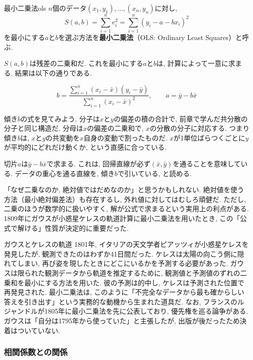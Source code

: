\begin{defi}{最小二乗法}{ols}
$n$個のデータ$(x_1, y_1), \ldots, (x_n, y_n)$に対し,
\[
  S(a, b) = \sum_{i=1}^{n} e_i^2 = \sum_{i=1}^{n} (y_i - a - bx_i)^2
\]
を最小にする$a$と$b$を選ぶ方法を\textbf{最小二乗法}（OLS: Ordinary Least Squares）と呼ぶ.
\end{defi}

$S(a, b)$は残差の二乗和だ.
これを最小にする$a$と$b$は, 計算によって一意に求まる.
結果は以下の通りである.

\[
  b = \frac{\displaystyle\sum_{i=1}^{n}(x_i - \bar{x})(y_i - \bar{y})}{\displaystyle\sum_{i=1}^{n}(x_i - \bar{x})^2}, \qquad a = \bar{y} - b\bar{x}
\]

傾き$b$の式を見てみよう.
分子は$x$と$y$の偏差の積の合計で, 前章で学んだ共分散の分子と同じ構造だ.
分母は$x$の偏差の二乗和で, $x$の分散の分子に対応する.
つまり傾き$b$は, $x$と$y$の共変動を$x$自身の変動で割ったものだ.
$x$が1単位ばらつくごとに$y$が平均的にどれだけ動くか, という直感に合っている.

切片$a$は$\bar{y} - b\bar{x}$で求まる.
これは, 回帰直線が必ず$(\bar{x}, \bar{y})$を通ることを意味している.
データの重心を通る直線を, 傾き$b$で引いている, と読める.

「なぜ二乗なのか, 絶対値ではだめなのか」と思うかもしれない.
絶対値を使う方法（最小絶対偏差法）も存在するし, 外れ値に対してはむしろ頑健だ.
ただし, 二乗のほうが数学的に扱いやすく, 解が公式で求まるという実用上の利点がある.
1809年にガウスが小惑星ケレスの軌道計算に最小二乗法を用いたとき, この「公式で解ける」性質が決定的に重要だった.

\begin{mybox}{ガウスとケレスの軌道}
1801年, イタリアの天文学者ピアッツィが小惑星ケレスを発見したが, 観測できたのはわずか41日間だった.
ケレスは太陽の向こう側に隠れてしまい, 再び姿を現したときにどこにいるかを予測する必要があった.
ガウスは限られた観測データから軌道を推定するために, 観測値と予測値のずれの二乗和を最小にする方法を用いた.
彼の予測は的中し, ケレスは予測された位置で再発見された.
最小二乗法は, このように「不完全なデータから最も確からしい答えを引き出す」という実務的な動機から生まれた道具だ.
なお, フランスのルジャンドルが1805年に最小二乗法を先に公表しており, 優先権を巡る論争がある.
ガウスは「自分は1795年から使っていた」と主張したが, 出版が後だったため決着はついていない.
\end{mybox}


\subsubsection*{相関係数との関係}

